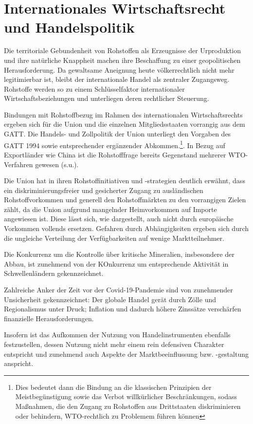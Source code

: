 \documentclass[12pt,a4paper,oneside]{book} %
\begin{document}
\section{Internationales Wirtschaftsrecht und Handelspolitik}
Die territoriale Gebundenheit von Rohstoffen als Erzeugnisse der Urproduktion und ihre natürliche Knappheit machen ihre Beschaffung zu einer geopolitischen Herausforderung. Da gewaltsame Aneignung heute völkerrechtlich nicht mehr legitimierbar ist, bleibt der internationale Handel als zentraler Zugangsweg. Rohstoffe werden so zu einem Schlüsselfaktor internationaler Wirtschaftsbeziehungen und unterliegen deren rechtlicher Steuerung.\autocite{Terhechte, Rohstoffverwaltung, Rn. 5}

Bindungen mit Rohstoffbezug im Rahmen des internationalen Wirtschaftsrechts ergeben sich für die Union und die einzelnen Mitgliedsstaaten vorrangig aus dem GATT. Die Handels- und Zollpolitik der Union unterliegt den Vorgaben des GATT 1994 sowie entsprechender ergänzender Abkommen.\footnote{Dies bedeutet dann die Bindung an die klassischen Prinzipien der Meistbegünstigung sowie das Verbot willkürlicher Beschränkungen, sodass Maßnahmen, die den Zugang zu Rohstoffen aus Drittstaaten diskriminieren oder behindern, WTO-rechtlich zu Problemem führen können}. In Bezug auf Exportländer wie China ist die Rohstofffrage bereits Gegenstand mehrerer WTO-Verfahren gewesen (s.u.).

Die Union hat in ihren Rohstoffinitiativen und -strategien deutlich erwähnt, dass ein diskriminierungsfreier und gesicherter Zugang zu ausländischen Rohstoffvorkommen und generell den Rohstoffmärkten zu den vorrangigen Zielen zählt, da die Union aufgrund mangelnder Heimvorkommen auf Importe angewiesen ist. Diese lässt sich, wie dargestellt, auch nicht durch europäische Vorkommen vollends ersetzen. Gefahren durch Abhängigkeiten ergeben sich durch die ungleiche Verteilung der Verfügbarkeiten auf wenige Marktteilnehmer.

Die Konkurrenz um die Kontrolle über kritische Mineralien, insbesondere der Abbau, ist zunehmend von der KOnkurrenz um entsprechende Aktivität in Schwellenländern gekennzeichnet.

Zahlreiche Anker der Zeit vor der Covid-19-Pandemie sind von zunehmender Unsicherheit gekennzeichnet: Der globale Handel gerät durch Zölle und Regionalismus unter Druck; Inflation und dadurch höhere Zinssätze verschärfen finanzielle Herausforderungen.

Insofern ist das Aufkommen der Nutzung von Handelinstrumenten ebenfalls festzustellen, dessen Nutzung nicht mehr einem rein defensiven Charakter entspricht und zunehmend auch Aspekte der Marktbeeinflussung bzw. -gestaltung anspricht.
\end{document}
